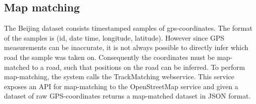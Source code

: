 \subsection{Map matching}
The Beijing dataset consists timestamped samples of gps-coordinates. The format of the samples is (id, date time, longitude, latitude). However since GPS measurements can be inaccurate, it is not always possible to directly infer which road the sample was taken on. Consequently the coordinates must be map-matched to a road, such that positions on the road can be inferred. To perform map-matching, the system calls the TrackMatching webservice\cite{TrackMatching}. This service exposes an API for map-matching to the OpenStreetMap service and given a dataset of raw GPS-coordinates returns a map-matched dataset in JSON format. 
